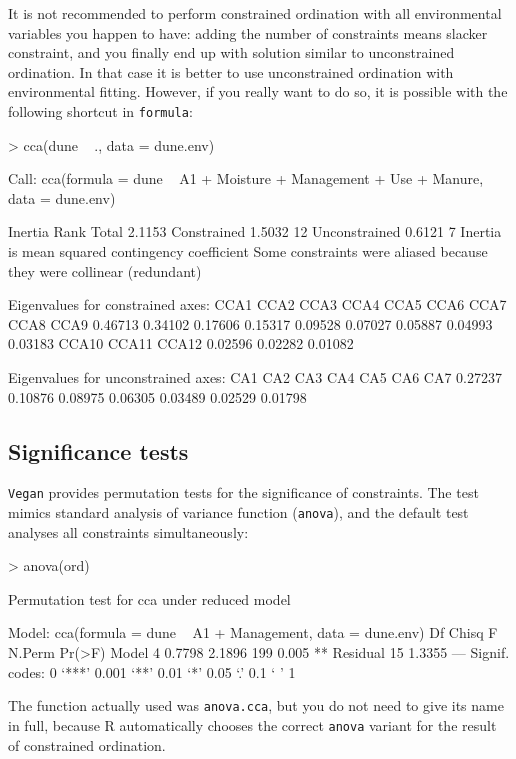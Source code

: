 \documentclass[a4paper,10pt]{amsart}
\begin{document}
It is not recommended to perform constrained ordination with all
environmental variables you happen to have: adding the number of
constraints means slacker constraint, and you finally end up with
solution similar to unconstrained ordination. In that case it is
better to use unconstrained ordination with environmental fitting.
However, if you really want to do so, it is possible with the
following shortcut in \texttt{formula}:
\begin{Schunk}
\begin{Sinput}
> cca(dune ~ ., data = dune.env)
\end{Sinput}
\begin{Soutput}
Call: cca(formula = dune ~ A1 + Moisture + Management + Use +
Manure, data = dune.env)

              Inertia Rank
Total          2.1153     
Constrained    1.5032   12
Unconstrained  0.6121    7
Inertia is mean squared contingency coefficient 
Some constraints were aliased because they were collinear (redundant)

Eigenvalues for constrained axes:
   CCA1    CCA2    CCA3    CCA4    CCA5    CCA6    CCA7    CCA8    CCA9 
0.46713 0.34102 0.17606 0.15317 0.09528 0.07027 0.05887 0.04993 0.03183 
  CCA10   CCA11   CCA12 
0.02596 0.02282 0.01082 

Eigenvalues for unconstrained axes:
    CA1     CA2     CA3     CA4     CA5     CA6     CA7 
0.27237 0.10876 0.08975 0.06305 0.03489 0.02529 0.01798 
\end{Soutput}
\end{Schunk}

\subsection{Significance tests}

\texttt{Vegan} provides permutation tests for the significance of
constraints.  The test mimics standard analysis of variance function
(\texttt{anova}), and the default test analyses all constraints
simultaneously:
\begin{Schunk}
\begin{Sinput}
> anova(ord)
\end{Sinput}
\begin{Soutput}
Permutation test for cca under reduced model

Model: cca(formula = dune ~ A1 + Management, data = dune.env)
         Df  Chisq      F N.Perm Pr(>F)   
Model     4 0.7798 2.1896    199  0.005 **
Residual 15 1.3355                        
---
Signif. codes:  0 ‘***’ 0.001 ‘**’ 0.01 ‘*’ 0.05 ‘.’ 0.1 ‘ ’ 1 
\end{Soutput}
\end{Schunk}
The function actually used was \texttt{anova.cca}, but you do not need
to give its name in full, because \textsf{R} automatically chooses the
correct \texttt{anova} variant for the result of constrained
ordination.
\end{document}
